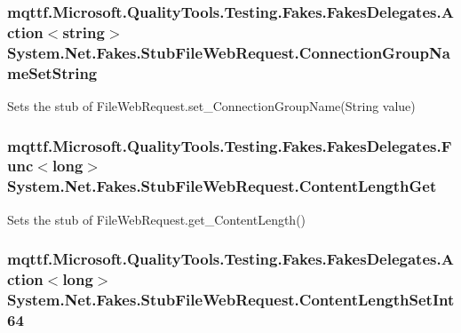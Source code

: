 \hypertarget{class_system_1_1_net_1_1_fakes_1_1_stub_file_web_request_a813fafae14d2b2c25bed3d49dc872021}{
\subsubsection[{Connection\-Group\-Name\-Set\-String}]{\setlength{\rightskip}{0pt plus 5cm}mqttf.\-Microsoft.\-Quality\-Tools.\-Testing.\-Fakes.\-Fakes\-Delegates.\-Action$<$string$>$ System.\-Net.\-Fakes.\-Stub\-File\-Web\-Request.\-Connection\-Group\-Name\-Set\-String}}\label{class_system_1_1_net_1_1_fakes_1_1_stub_file_web_request_a813fafae14d2b2c25bed3d49dc872021}


Sets the stub of File\-Web\-Request.\-set\-\_\-\-Connection\-Group\-Name(\-String value)

\hypertarget{class_system_1_1_net_1_1_fakes_1_1_stub_file_web_request_aa726c198d45740251fbede503cd5ec28}{
\subsubsection[{Content\-Length\-Get}]{\setlength{\rightskip}{0pt plus 5cm}mqttf.\-Microsoft.\-Quality\-Tools.\-Testing.\-Fakes.\-Fakes\-Delegates.\-Func$<$long$>$ System.\-Net.\-Fakes.\-Stub\-File\-Web\-Request.\-Content\-Length\-Get}}\label{class_system_1_1_net_1_1_fakes_1_1_stub_file_web_request_aa726c198d45740251fbede503cd5ec28}


Sets the stub of File\-Web\-Request.\-get\-\_\-\-Content\-Length()

\hypertarget{class_system_1_1_net_1_1_fakes_1_1_stub_file_web_request_af4da4863fbcfe3a9997e0cc8c35d1313}{
\subsubsection[{Content\-Length\-Set\-Int64}]{\setlength{\rightskip}{0pt plus 5cm}mqttf.\-Microsoft.\-Quality\-Tools.\-Testing.\-Fakes.\-Fakes\-Delegates.\-Action$<$long$>$ System.\-Net.\-Fakes.\-Stub\-File\-Web\-Request.\-Content\-Length\-Set\-Int64}}\label{class_system_1_1_net_1_1_fakes_1_1_stub_file_web_request_af4da4863fbcfe3a9997e0cc8c35d1313}



